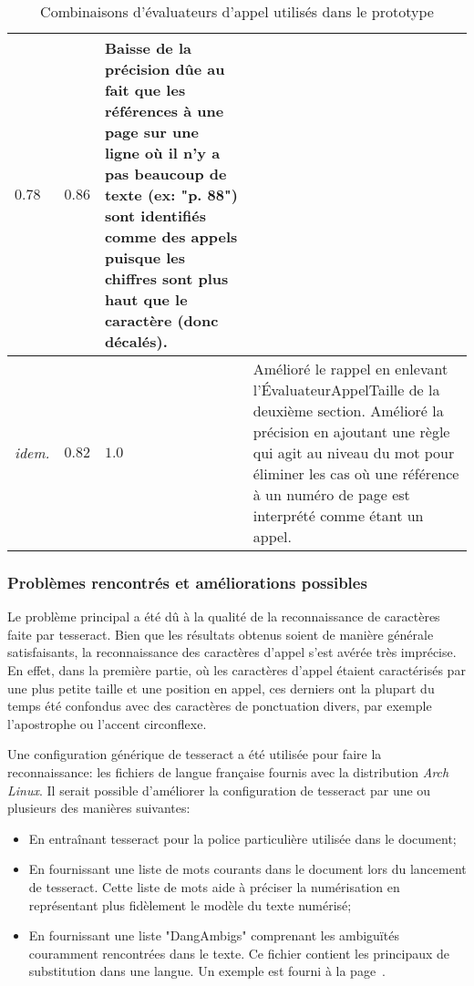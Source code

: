 \begin{table}
\begin{tabular}{| p{6cm} | p{2cm} | p{1.25cm} | p{6cm} |}
    $0.78$ & $0.86$ &
    Baisse de la précision dûe au fait que les références à une page sur une ligne où il n'y a pas beaucoup de texte (ex: "p. 88") sont identifiés comme des appels puisque les chiffres sont plus haut que le caractère (donc décalés).
    \\ \hline
    \emph{idem.} & $0.82$ & $1.0$ &
    Amélioré le rappel en enlevant l'ÉvaluateurAppelTaille de la deuxième section. Amélioré la précision en ajoutant une règle qui agit au niveau du mot pour éliminer les cas où une référence à un numéro de page est interprété comme étant un appel.
    \\ \hline
\end{tabular}
\caption{Combinaisons d'évaluateurs d'appel utilisés dans le prototype}
\label{combinaisons-evaluateurs}
\end{table}

\subsubsection{Problèmes rencontrés et améliorations possibles}
Le problème principal a été dû à la qualité de la reconnaissance de caractères faite par tesseract. Bien que les résultats obtenus soient de manière générale satisfaisants, la reconnaissance des caractères d'appel s'est avérée très imprécise. En effet, dans la première partie, où les caractères d'appel étaient caractérisés par une plus petite taille et une position en appel, ces derniers ont la plupart du temps été confondus avec des caractères de ponctuation divers, par exemple l'apostrophe ou l'accent circonflexe.

Une configuration générique de tesseract a été utilisée pour faire la reconnaissance: les fichiers de langue française fournis avec la distribution \emph{Arch Linux}. Il serait possible d'améliorer la configuration de tesseract par une ou plusieurs des manières suivantes:
\begin{itemize}
    \item En entraînant tesseract pour la police particulière utilisée dans le document;
    \item En fournissant une liste de mots courants dans le document lors du lancement de tesseract. Cette liste de mots aide à préciser la numérisation en représentant plus fidèlement le modèle du texte numérisé;
    \item En fournissant une liste "DangAmbigs" comprenant les ambiguïtés couramment rencontrées dans le texte. Ce fichier contient les principaux de substitution dans une langue. Un exemple est fourni à la page~\pageref{figure-dangambigs}.
\end{itemize}

